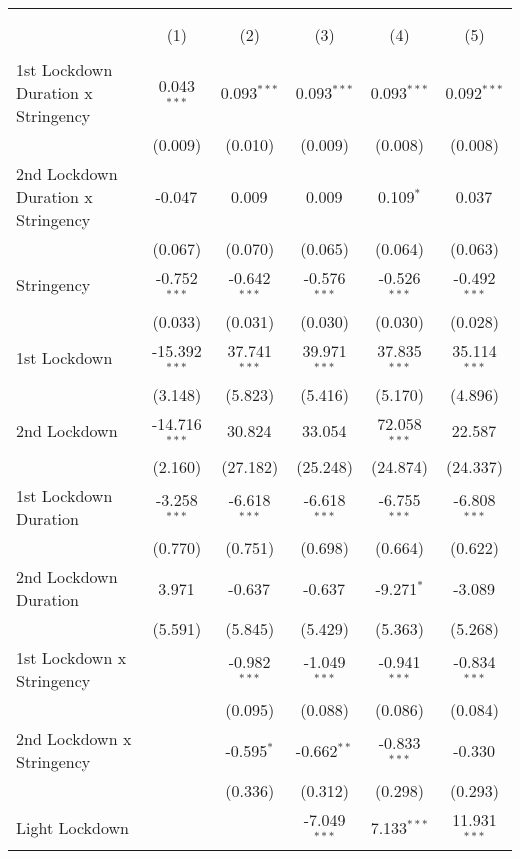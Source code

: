 \begin{tabular}{@{\extracolsep{5pt}}lccccc}
\\[-1.8ex]\hline
\hline \\[-1.8ex]
& \multicolumn{5}{c}{\textit{}} \
\cr \cline{5-6}
\\[-1.8ex] & (1) & (2) & (3) & (4) & (5) \\
\hline \\[-1.8ex]
 1st Lockdown Duration x Stringency & 0.043$^{***}$ & 0.093$^{***}$ & 0.093$^{***}$ & 0.093$^{***}$ & 0.092$^{***}$ \\
  & (0.009) & (0.010) & (0.009) & (0.008) & (0.008) \\
 2nd Lockdown Duration x Stringency & -0.047$^{}$ & 0.009$^{}$ & 0.009$^{}$ & 0.109$^{*}$ & 0.037$^{}$ \\
  & (0.067) & (0.070) & (0.065) & (0.064) & (0.063) \\
 Stringency & -0.752$^{***}$ & -0.642$^{***}$ & -0.576$^{***}$ & -0.526$^{***}$ & -0.492$^{***}$ \\
  & (0.033) & (0.031) & (0.030) & (0.030) & (0.028) \\
 1st Lockdown & -15.392$^{***}$ & 37.741$^{***}$ & 39.971$^{***}$ & 37.835$^{***}$ & 35.114$^{***}$ \\
  & (3.148) & (5.823) & (5.416) & (5.170) & (4.896) \\
 2nd Lockdown & -14.716$^{***}$ & 30.824$^{}$ & 33.054$^{}$ & 72.058$^{***}$ & 22.587$^{}$ \\
  & (2.160) & (27.182) & (25.248) & (24.874) & (24.337) \\
 1st Lockdown Duration & -3.258$^{***}$ & -6.618$^{***}$ & -6.618$^{***}$ & -6.755$^{***}$ & -6.808$^{***}$ \\
  & (0.770) & (0.751) & (0.698) & (0.664) & (0.622) \\
 2nd Lockdown Duration & 3.971$^{}$ & -0.637$^{}$ & -0.637$^{}$ & -9.271$^{*}$ & -3.089$^{}$ \\
  & (5.591) & (5.845) & (5.429) & (5.363) & (5.268) \\
 1st Lockdown x Stringency & & -0.982$^{***}$ & -1.049$^{***}$ & -0.941$^{***}$ & -0.834$^{***}$ \\
  & & (0.095) & (0.088) & (0.086) & (0.084) \\
 2nd Lockdown x Stringency & & -0.595$^{*}$ & -0.662$^{**}$ & -0.833$^{***}$ & -0.330$^{}$ \\
  & & (0.336) & (0.312) & (0.298) & (0.293) \\
 Light Lockdown & & & -7.049$^{***}$ & 7.133$^{***}$ & 11.931$^{***}$ \\

\end{tabular}
